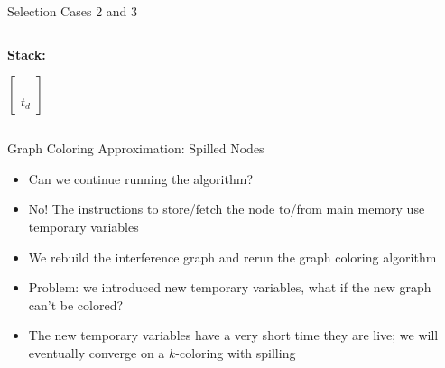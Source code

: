 \documentclass[aspectratio=169]{beamer}
\begin{document}
\begin{frame}{Selection Cases 2 and 3}
    \begin{columns}
        \begin{column}{1cm}
            \textbf{Stack:}
            \vspace{0cm}
            
            $\begin{bmatrix}
                \\ \\ \\ t_d
            \end{bmatrix}$
        \end{column}
        \begin{column}{8cm}
        \end{column}
    \end{columns}
\end{frame}

\begin{frame}{Graph Coloring Approximation: Spilled Nodes}
    \begin{itemize}
        \item Can we continue running the algorithm?
        \pause
        \item No! The instructions to store/fetch the node to/from main memory use temporary variables
        \item We rebuild the interference graph and rerun the graph coloring algorithm
        \pause
        \item Problem: we introduced new temporary variables, what if the new graph can't be colored?
        \pause
        \item The new temporary variables have a very short time they are live; we will eventually converge on a $k$-coloring with spilling
    \end{itemize}
\end{frame}
\end{document}
